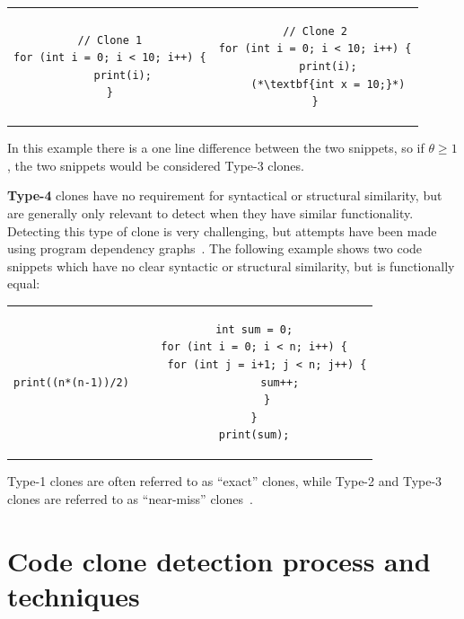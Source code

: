 \begin{tcolorbox}
	\begin{center}
		\begin{tabular}{c | c}
			\begin{lstlisting}
// Clone 1
for (int i = 0; i < 10; i++) {
    print(i);
}
\end{lstlisting} &
			\begin{lstlisting}
// Clone 2
for (int i = 0; i < 10; i++) {
    print(i);
    (*\textbf{int x = 10;}*)
}
\end{lstlisting}
		\end{tabular}
	\end{center}
\end{tcolorbox}




In this example there is a one line difference between the two snippets, so if $\theta
	\geq
	1$, the two snippets would be considered Type-3 clones.

\textbf{Type-4} clones have no requirement for syntactical or structural similarity, but
are generally only relevant to detect when they have similar functionality. Detecting this
type of clone is very challenging, but attempts have been made using program dependency
graphs~\cite{SeedType4Detection}. The following example shows two code snippets which have
no clear syntactic or structural similarity, but is functionally equal:

\begin{tcolorbox}
	\begin{center}
		\begin{tabular}{c | c}
			\begin{lstlisting}
print((n*(n-1))/2)
\end{lstlisting} &
			\begin{lstlisting}
int sum = 0;
for (int i = 0; i < n; i++) {
    for (int j = i+1; j < n; j++) {
        sum++;
    }
}
print(sum);
\end{lstlisting}
		\end{tabular}
	\end{center}
\end{tcolorbox}


Type-1 clones are often referred to as ``exact'' clones, while Type-2 and Type-3 clones
are referred to as ``near-miss'' clones~\cite[1]{Zibran_real_time_search}.

\section{Code clone detection process and techniques}

